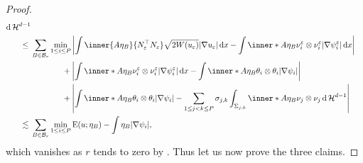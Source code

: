 \begin{proof}
\begin{align*}
{				\dd{ \hm^{ d - 1 } }
		}
		\\
		\leq{} &
		\sum_{ B \in \mathcal{ B }_{ r } }
			\min_{ 1 \leq i \leq P }
				\abs{ 
					\int
						\inner{ A \eta_{ B } }{ N_{ \varepsilon }^{ \top } N_{ \varepsilon } }
						\sqrt{ 2 W ( u_{ \varepsilon } ) }
						\abs{ \nabla u_{ \varepsilon } }
					\dd{ x }
					-
					\int
						\inner*{ A \eta_{ B } }
						{ \nu_{ i }^{ \varepsilon } \otimes \nu_{ i }^{ 
						\varepsilon } }
						\abs{ \nabla \psi_{ i }^{ \varepsilon } }
					\dd{ x }
				}
			\\
			& \quad \quad \quad \;\;\;\!\:+
			\abs{ 
				\int
					\inner*{ A \eta_{ B } }{ \nu_{ i }^{ \varepsilon } \otimes \nu_{ i }^{ \varepsilon } }
					\abs{ \nabla \psi_{ i }^{ \varepsilon } }
				\dd{ x }
				-
				\int
					\inner*{ A \eta_{ B } }
					{ \theta_{ i } \otimes \theta_{ i } }
				\abs{ \nabla \psi_{ i } }
			}
			\\
			& \quad \quad \quad \;\;\;\!\: +
			\abs{ 
				\int
					\inner*{ A \eta_{ B } }
					{ \theta_{ i } \otimes \theta_{ i } }
				\abs{ \nabla \psi_{ i } }
				-
				\sum_{ 1 \leq j < k \leq P }
					\sigma_{ j , k }
					\int_{ \Sigma_{ j , k } }
						\inner*{ A \eta_{ B } }
						{ \nu_{ j } \otimes \nu_{ j } }
					\dd{ \hm^{ d - 1 } }
			}
		\\
		\lesssim {} &
			\sum_{ B \in \mathcal{ B }_{ r } }
				\min_{ 1 \leq i \leq P }
					\energy ( u ; \eta_{ B } )
					-
					\int
						\eta_{ B }
					\abs{ \nabla \psi_{ i } },
	\end{align*}
	which vanishes as $ r $ tends to zero by 
	.
	Thus let us now prove the three claims.
	

\end{proof}

